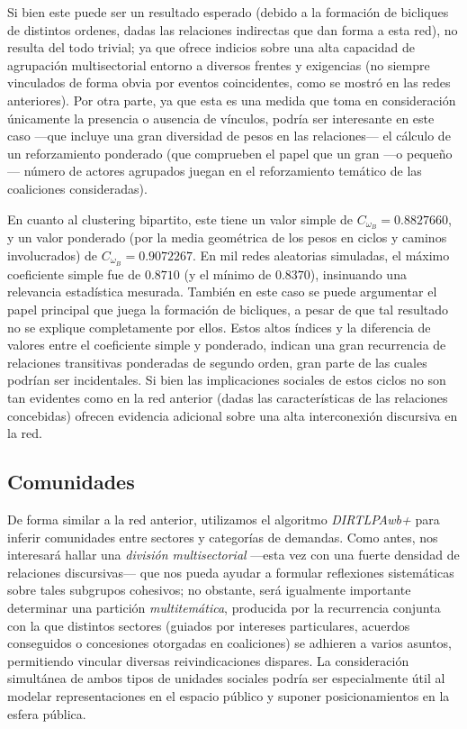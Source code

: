 \documentclass[letterpaper, 11pt]{book}
\theoremstyle{definition}
\theoremstyle{remark}
\begin{document}
Si bien este puede ser un resultado esperado (debido a la formación de bicliques de distintos ordenes, dadas las relaciones indirectas que dan forma a esta red), no resulta del todo trivial; ya que ofrece indicios sobre una alta capacidad de agrupación multisectorial entorno a diversos frentes y exigencias (no siempre vinculados de forma obvia por eventos coincidentes, como se mostró en las redes anteriores). 
Por otra parte, ya que esta es una medida que toma en consideración únicamente la presencia o ausencia de vínculos, podría ser interesante en este caso ---que incluye una gran diversidad de pesos en las relaciones--- el cálculo de un reforzamiento ponderado (que comprueben el papel que un gran ---o pequeño--- número de actores agrupados juegan en el reforzamiento temático de las coaliciones consideradas).


En cuanto al clustering bipartito, este tiene un valor simple de $C_{\omega_B} = 0.8827660$, y un valor ponderado (por la media geométrica de los pesos en ciclos y caminos involucrados) de $C_{\omega_B} = 0.9072267$. 
En mil redes aleatorias simuladas, el máximo coeficiente simple fue de $0.8710$ (y el mínimo de $0.8370$), insinuando una relevancia estadística mesurada. 
También en este caso se puede argumentar el papel principal que juega la formación de bicliques, a pesar de que tal resultado no se explique completamente por ellos. 
Estos altos índices y la diferencia de valores entre el coeficiente simple y ponderado, indican una gran recurrencia de relaciones transitivas ponderadas de segundo orden, gran parte de las cuales podrían ser incidentales. 
Si bien las implicaciones sociales de estos ciclos no son tan evidentes como en la red anterior (dadas las características de las relaciones concebidas) ofrecen evidencia adicional sobre una alta interconexión discursiva en la red. 




\subsection{Comunidades}
\label{subsec:Comunidades_TiposCat}

De forma similar a la red anterior, utilizamos el algoritmo \emph{DIRTLPAwb+} para inferir comunidades entre sectores y categorías de demandas. 
Como antes, nos interesará hallar una \emph{división multisectorial} ---esta vez con una fuerte densidad de relaciones discursivas--- que nos pueda ayudar a formular reflexiones sistemáticas sobre tales subgrupos cohesivos; no obstante, será igualmente importante determinar una partición \emph{multitemática}, producida por la recurrencia conjunta con la que distintos sectores (guiados por intereses particulares, acuerdos conseguidos o concesiones otorgadas en coaliciones) se adhieren a varios asuntos, permitiendo vincular diversas reivindicaciones dispares. 
La consideración simultánea de ambos tipos de unidades sociales podría ser especialmente útil al modelar representaciones en el espacio público y suponer posicionamientos en la esfera pública. 
\end{document}
